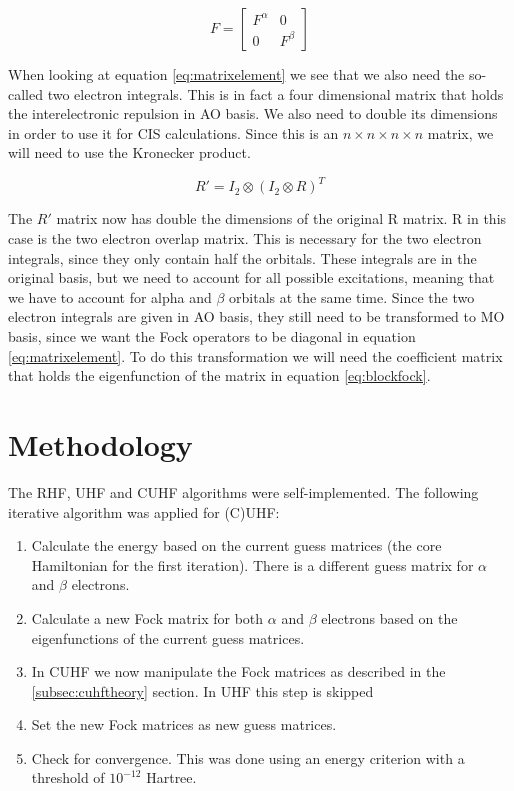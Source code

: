 \begin{equation}\label{eq:blockfock}
  F = \begin{bmatrix}
    F^\alpha & 0       \\
    0        & F^\beta
  \end{bmatrix}
\end{equation}

When looking at equation \eqref{eq:matrixelement} we see that we also need the so-called two electron integrals. This is in fact a four dimensional matrix that holds the
interelectronic repulsion in AO basis. We also need to double its dimensions in order to use it for CIS calculations. Since this is an $n\times n\times n \times n$
matrix, we will need to use the Kronecker product.

\begin{equation}\label{eq:kron}
  R' = I_2 \otimes (I_2 \otimes R)^T
\end{equation}

The $R'$ matrix now has double the dimensions of the original R matrix. R in this case is the two electron overlap matrix. This is necessary for the two electron integrals, since
they only contain half the orbitals. These integrals are in the original basis, but we need to account for all possible excitations, meaning that we have to account for alpha and
$\beta$ orbitals at the same time. Since the two electron integrals are given in AO basis, they still need to be transformed to MO basis, since we want the Fock operators to be
diagonal in equation \eqref{eq:matrixelement}. To do this transformation we will need the coefficient matrix that holds the eigenfunction of the matrix in equation
\eqref{eq:blockfock}.

\section{Methodology}
\label{sec:method}
The RHF, UHF and CUHF algorithms were self-implemented. The following iterative algorithm was applied for (C)UHF:
\begin{enumerate}
  \item Calculate the energy based on the current guess matrices (the core Hamiltonian for the first iteration). There is a different guess matrix for $\alpha$ and $\beta$ electrons.
  \item Calculate a new Fock matrix for both $\alpha$ and $\beta$ electrons based on the eigenfunctions of the current guess matrices.
  \item In CUHF we now manipulate the Fock matrices as described in the \ref{subsec:cuhftheory} section. In UHF this step is skipped
  \item Set the new Fock matrices as new guess matrices.
  \item Check for convergence. This was done using an energy criterion with a threshold of $10^{-12}$ Hartree.
\end{enumerate}


